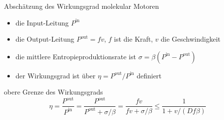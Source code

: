 \documentclass[aspectratio=1610, 9pt]{beamer}
\begin{document}
\begin{frame}{Abschätzung des Wirkungsgrad molekular Motoren}
  \begin{itemize}
    \item die Input-Leitung $P^\text{in}$
    \item die Output-Leitung $P^\text{out}= f v $, $f$ ist die Kraft, $v$ die Geschwindigkeit
    \item die mittlere Entropieproduktionsrate ist $\sigma = \beta( P^\text{in} - P^\text{out})$
    \item der Wirkungsgrad ist über $\eta = P^\text{out} / P^\text{in}$ definiert
  \end{itemize}
  \begin{block}{obere Grenze des Wirkungsgrads}
    \begin{equation*} 
     \eta = \frac{P^\text{out}}{P^\text{in}} =  \frac{P^\text{out}}{P^\text{out} + \sigma / \beta } =  \frac{ f v }{f v+ \sigma / \beta }
     \leq \frac{ 1}{1+ v / (D f \beta) }
    \end{equation*}
  \end{block}
\end{frame}
\end{document}
